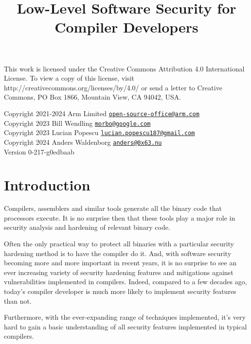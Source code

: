 \documentclass[
  a4paper,
]{report}
\title{Low-Level Software Security for Compiler Developers}
\author{}
\date{}
\begin{document}
\maketitle

\clearpage

\vspace*{\fill}
This work is licensed under the Creative Commons Attribution 4.0 International
License. To view a copy of this license, visit
http://creativecommons.org/licenses/by/4.0/ or send a letter to Creative
Commons, PO Box 1866, Mountain View, CA 94042, USA.

  Copyright 2021-2024 Arm Limited
\href{mailto:open-source-office@arm.com}{\nolinkurl{open-source-office@arm.com}}\\
  Copyright 2023 Bill Wendling
\href{mailto:morbo@google.com}{\nolinkurl{morbo@google.com}}\\
  Copyright 2023 Lucian Popescu
\href{mailto:lucian.popescu187@gmail.com}{\nolinkurl{lucian.popescu187@gmail.com}}\\
  Copyright 2024 Anders Waldenborg
\href{mailto:anders@0x63.nu}{\nolinkurl{anders@0x63.nu}}\\

Version 0-217-g0edbaab
\clearpage

{
\hypersetup{linkcolor=}
\setcounter{tocdepth}{2}
\tableofcontents
}
\chapter{Introduction}\label{introduction}

Compilers, assemblers and similar tools generate all the binary code
that processors execute. It is no surprise then that these tools play a
major role in security analysis and hardening of relevant binary code.

Often the only practical way to protect all binaries with a particular
security hardening method is to have the compiler do it. And, with
software security becoming more and more important in recent years, it
is no surprise to see an ever increasing variety of security hardening
features and mitigations against vulnerabilities implemented in
compilers. Indeed, compared to a few decades ago, today's compiler
developer is much more likely to implement security features than not.

Furthermore, with the ever-expanding range of techniques implemented,
it's very hard to gain a basic understanding of all security features
implemented in typical compilers.
\end{document}

